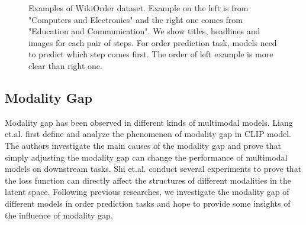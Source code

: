 \documentclass[11pt]{article}
\begin{document}
\begin{figure}[htp]
\centering 
{}
\caption{\label{fig:compare}Examples of WikiOrder dataset. Example on the left is from "Computers and Electronics" and the right one comes from "Education and Communication". We show titles, headlines and images for each pair of steps. For order prediction task, models need to predict which step comes first. The order of left example is more clear than right one.}
\end{figure}

\subsection{Modality Gap}
Modality gap has been observed in different kinds of multimodal models\citep{xu2021videoclip,zhang2023multimodal,radford2021learning}. Liang et.al.\citep{liang2022mind} first define and analyze the phenomenon of modality gap in CLIP\citep{radford2021learning} model. The authors investigate the main causes of the modality gap and prove that simply adjusting the modality gap can change the performance of multimodal models on downstream tasks. Shi et.al.\citep{shi2023towards} conduct several experiments to prove that the loss function can directly affect the structures of different modalities in the latent space. Following previous researches, we investigate the modality gap of different models in order prediction tasks and hope to provide some insights of the influence of modality gap.

\end{document}
